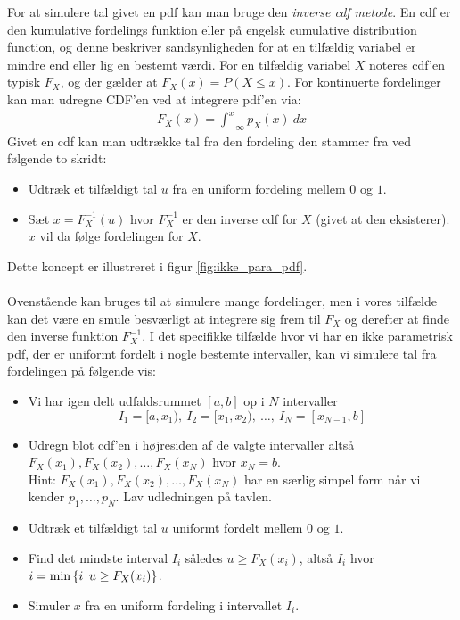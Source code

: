 \documentclass{article}
\newcommand*{\cond}{\hspace*{1pt} |\hspace*{1pt}}
\begin{document}
For at simulere tal givet en pdf kan man bruge den \textit{inverse cdf metode}. En cdf er den kumulative fordelings funktion eller på engelsk cumulative distribution function, og denne beskriver sandsynligheden for at en tilfældig variabel er mindre end eller lig en bestemt værdi. For en tilfældig variabel $X$ noteres cdf'en typisk $F_X$, og der gælder at $F_X(x) = P(X \leq x)$. For kontinuerte fordelinger kan man udregne CDF'en ved at integrere pdf'en via:
\begin{align*}
F_X(x) = \int_{-\infty}^{x} p_X(x) \ dx
\end{align*}
Givet en cdf kan man udtrække tal fra den fordeling den stammer fra ved følgende to skridt:
\begin{itemize}
\item Udtræk et tilfældigt tal $u$ fra en uniform fordeling mellem $0$ og $1$. 
\item Sæt $x = F_X^{-1}(u)$ hvor $F_X^{-1}$ er den inverse cdf for $X$ (givet at den eksisterer). $x$ vil da følge fordelingen for $X$.
\end{itemize}
Dette koncept er illustreret i figur \ref{fig:ikke_para_pdf}. 
\\ \\
Ovenstående kan bruges til at simulere mange fordelinger, men i vores tilfælde kan det være en smule besværligt at integrere sig frem til $F_X$ og derefter at finde den inverse funktion $F_X^{-1}$. I det specifikke tilfælde hvor vi har en ikke parametrisk pdf, der er uniformt fordelt i nogle bestemte intervaller, kan vi simulere tal fra fordelingen på følgende vis:
\begin{itemize}
\item Vi har igen delt udfaldsrummet $[a,b]$ op i $N$ intervaller$$I_1 = [a,x_1),\ I_2 = [x_1,x_2),\ \dots,\ I_N = [x_{N-1},b]$$
\item Udregn blot cdf'en i højresiden af de valgte intervaller altså $F_X(x_1), F_X(x_2), \dots, F_X(x_N)$ hvor $x_N = b$. \\
Hint: $F_X(x_1), F_X(x_2), \dots, F_X(x_N)$ har en særlig simpel form når vi kender $p_1, \dots, p_N$. Lav udledningen på tavlen. 
\item Udtræk et tilfældigt tal $u$ uniformt fordelt mellem $0$ og $1$. 
\item Find det mindste interval $I_i$ således $u \geq F_X(x_i)$, altså $I_i$ hvor $i = \min\left\{i \cond u \geq F_X(x_i) \right\}$. 
\item Simuler $x$ fra en uniform fordeling i intervallet $I_i$. 
\end{itemize}
\end{document}
